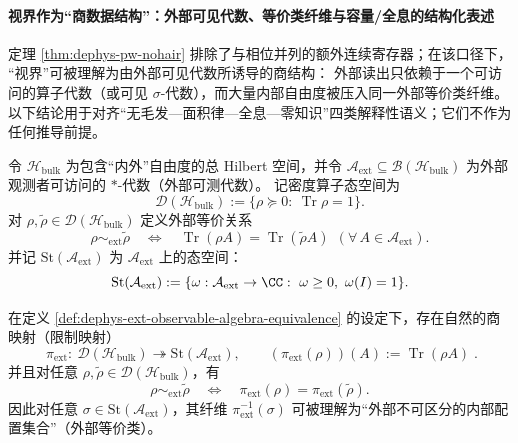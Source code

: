 \paragraph{视界作为“商数据结构”：外部可见代数、等价类纤维与容量/全息的结构化表述}
定理 \ref{thm:dephys-pw-nohair} 排除了与相位并列的额外连续寄存器；在该口径下，
“视界”可被理解为由外部可见代数所诱导的商结构：
外部读出只依赖于一个可访问的算子代数（或可见 \(\sigma\)-代数），而大量内部自由度被压入同一外部等价类纤维。
以下结论用于对齐“无毛发—面积律—全息—零知识”四类解释性语义；它们不作为任何推导前提。

\begin{definition}[外部可见代数与外部等价关系]\label{def:dephys-ext-observable-algebra-equivalence}
令 \(\mathcal{H}_{\mathrm{bulk}}\) 为包含“内外”自由度的总 Hilbert 空间，并令
\(\mathcal{A}_{\mathrm{ext}}\subseteq \mathcal{B}(\mathcal{H}_{\mathrm{bulk}})\)
为外部观测者可访问的 \(\ast\)-代数（外部可测代数）。
记密度算子态空间为
\[
\mathcal{D}(\mathcal{H}_{\mathrm{bulk}})
:=\{\rho\succeq 0:\ \operatorname{Tr}\rho=1\}.
\]
对 \(\rho,\tilde\rho\in\mathcal{D}(\mathcal{H}_{\mathrm{bulk}})\) 定义外部等价关系
\begin{equation}\label{eq:dephys-ext-equivalence}
\boxed{\;
\rho\sim_{\mathrm{ext}}\tilde\rho
\quad\Longleftrightarrow\quad
\operatorname{Tr}(\rho A)=\operatorname{Tr}(\tilde\rho A)\ \ (\forall\,A\in\mathcal{A}_{\mathrm{ext}}).\;}
\end{equation}
并记 \(\mathrm{St}(\mathcal{A}_{\mathrm{ext}})\) 为 \(\mathcal{A}_{\mathrm{ext}}\) 上的态空间：
\[
\mathrm{St}(\mathcal{A}_{\mathrm{ext}})
:=\{\omega:\mathcal{A}_{\mathrm{ext}}\to\CC:\ \omega\ge 0,\ \omega(I)=1\}.
\]
\end{definition}

\begin{proposition}\label{prop:dephys-horizon-quotient-data-structure}
在定义 \ref{def:dephys-ext-observable-algebra-equivalence} 的设定下，存在自然的商映射（限制映射）
\begin{equation}\label{eq:dephys-ext-quotient-map}
\boxed{\;
\pi_{\mathrm{ext}}:\ \mathcal{D}(\mathcal{H}_{\mathrm{bulk}})\twoheadrightarrow \mathrm{St}(\mathcal{A}_{\mathrm{ext}}),
\qquad
(\pi_{\mathrm{ext}}(\rho))(A):=\operatorname{Tr}(\rho A)\; }.
\end{equation}
并且对任意 \(\rho,\tilde\rho\in\mathcal{D}(\mathcal{H}_{\mathrm{bulk}})\)，有
\[
\boxed{\;
\rho\sim_{\mathrm{ext}}\tilde\rho
\quad\Longleftrightarrow\quad
\pi_{\mathrm{ext}}(\rho)=\pi_{\mathrm{ext}}(\tilde\rho).\;}
\]
因此对任意 \(\sigma\in \mathrm{St}(\mathcal{A}_{\mathrm{ext}})\)，其纤维
\(
\pi_{\mathrm{ext}}^{-1}(\sigma)
\)
可被理解为“外部不可区分的内部配置集合”（外部等价类）。
\end{proposition}

